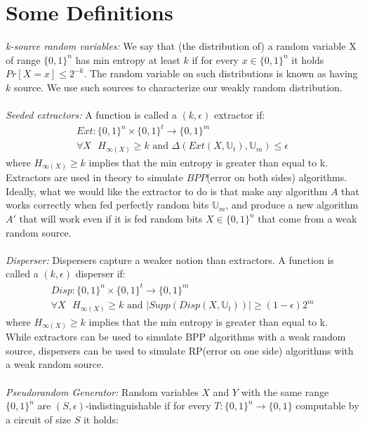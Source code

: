 \section{Some Definitions}
\par 
\textit{k-source random variables: }We say that (the distribution of) a random variable X of range $\{0, 1\}^n$ has min entropy at least $k$ if for every $x \in \{0, 1\}^n$ it holds $Pr[X = x] \leq 2^{−k}$. The random variable on such distributions is known as having $k$ source. We use such sources to characterize our weakly random distribution.
\\~\\
\textit{Seeded extractors: }A function is called a $(k,\epsilon)$ extractor if:
\begin{align*}
	Ext: \{0,1\}^n \times \{ 0,1\}^t \rightarrow \{0,1\}^m
	\\
	\forall X \text{ } H_{\infty(X)} \geq k \text{  and  } \Delta(Ext(X,\mathbb{U}_t),\mathbb{U}_m) \leq \epsilon
\end{align*}
where $H_{\infty(X)} \geq k$ implies that the min entropy is greater than equal to k.
\\
Extractors are used in theory to simulate $BPP$(error on both sides) algorithms. Ideally, what we would like the extractor to do is that make any algorithm $A$ that works correctly when fed perfectly random bits $\mathbb{U}_m$, and produce a new algorithm $A'$ that will work even if it is fed random bits $X \in \{0,1\}^n$ that come from a weak random source.
\\~\\
\textit{Disperser: }Dispersers capture a weaker notion than extractors. A function is called a $(k,\epsilon)$ disperser if:
\begin{align*}
Disp: \{0,1\}^n \times \{ 0,1\}^t \rightarrow \{0,1\}^m
\\
\forall X \text{ } H_{\infty(X)} \geq k \text{  and  } |Supp(Disp(X,\mathbb{U}_t))| \geq (1-\epsilon)2^m
\end{align*}
where $H_{\infty(X)} \geq k$ implies that the min entropy is greater than equal to k.
\\
While extractors can be used to simulate BPP algorithms with a weak random source, dispersers can be used to simulate RP(error on one side) algorithms with a weak random source.
\\~\\
\textit{Pseudorandom Generator: }Random variables $X$ and $Y$ with the same range $\{0,1\}^n$ are $(S,\epsilon)$-indistinguishable if for every $T : \{0,1\}^n \rightarrow \{0,1\}$ computable by a circuit of size $S$ it holds:
